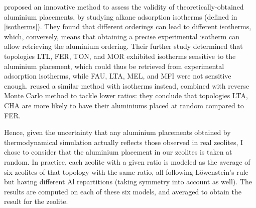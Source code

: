 \documentclass[main.tex]{subfiles}
\begin{document}
\Textcite{AlDistributionAlcanes} proposed an innovative method to assess the validity of theoretically-obtained aluminium placements, by studying alkane adsorption isotherms (defined in \cref{isotherms}). They found that different \SiAl orderings can lead to different isotherms, which, conversely, means that obtaining a precise experimental isotherm can allow retrieving the aluminium ordering. Their further study \cite{AlDistributionAlcanes2} determined that topologies LTL, FER, TON, and MOR exhibited isotherms sensitive to the aluminium placement, which could thus be retrieved from experimental adsorption isotherms, while FAU, LTA, MEL, and MFI were not sensitive enough. \Textcite{AlDistributionCO2Adsorption} reused a similar method with  isotherms instead, combined with reverse Monte Carlo method to tackle lower \SiAl ratios: they conclude that topologies LTA, CHA are more likely to have their aluminiums placed at random compared to FER.

Hence, given the uncertainty that any aluminium placements obtained by thermodynamical simulation actually reflects those observed in real zeolites, I chose to consider that the aluminium placement in our zeolites is taken at random. In practice, each zeolite with a given \SiAl ratio is modeled as the average of six zeolites of that topology with the same \SiAl ratio, all following L\"owenstein's rule but having different Al repartitions (taking symmetry into account as well). The results are computed on each of these six models, and averaged to obtain the result for the zeolite.
\end{document}
